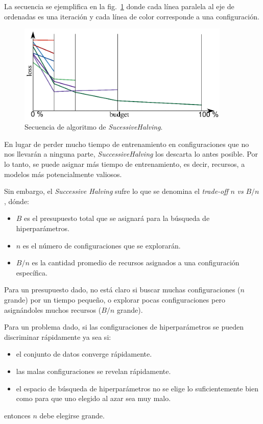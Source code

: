 \documentclass[a4paper,12pt]{article}
\begin{document}
La secuencia se ejemplifica en la fig.~\ref{fig:sh} donde cada línea paralela al eje de ordenadas es una iteración y cada línea de color corresponde a una configuración.

\begin{figure}[H]
	\begin{center}
	\includegraphics[width=0.9\textwidth]{sucessive_halving.png}
  	\caption{Secuencia de algoritmo de \textit{SucessiveHalving}.}
  	\label{fig:sh}
  	\end{center}
\end{figure}

En lugar de perder mucho tiempo de entrenamiento en configuraciones que no nos llevarán a ninguna parte, \textit{SuccessiveHalving} los descarta lo antes posible. Por lo tanto, se puede asignar más tiempo de entrenamiento, es decir, recursos, a modelos más potencialmente valiosos.

Sin embargo, el \textit{Successive Halving} sufre lo que se denomina el \textit{trade-off} $n$ \textit{vs} $B/n$ \citep{Bissuel2019Apr}, dónde:
\begin{itemize}[noitemsep, topsep=2pt]
	\item $B$ es el presupuesto total que se asignará para la búsqueda de hiperparámetros.
	\item $n$ es el número de configuraciones que se explorarán.
	\item $B/n$ es la cantidad promedio de recursos asignados a una configuración específica.
\end{itemize}

Para un presupuesto dado, no está claro si buscar muchas configuraciones ($n$ grande) por un tiempo pequeño, o explorar pocas configuraciones pero asignándoles muchos recursos ($B/n$ grande). 

Para un problema dado, si las configuraciones de hiperparámetros se pueden discriminar rápidamente ya sea si:

\begin{itemize}[noitemsep, topsep=2pt]
	\item el conjunto de datos converge rápidamente.
	\item las malas configuraciones se revelan rápidamente.
	\item el espacio de búsqueda de hiperparámetros no se elige lo suficientemente bien como para que uno elegido al azar sea muy malo.
\end{itemize}
entonces $n$ debe elegirse grande.
\end{document}

